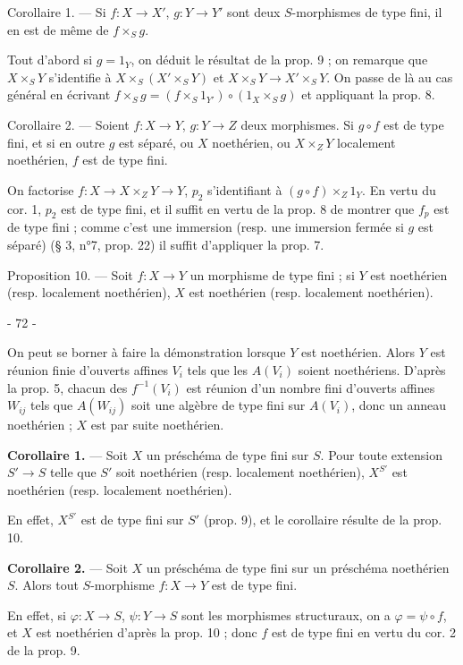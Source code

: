 Corollaire 1. — Si $f : X \to X'$, $g : Y \to Y'$ sont deux $S$-morphismes de type fini, il en est de même de $f \times_S g$.

Tout d'abord si $g = 1_Y$, on déduit le résultat de la prop. 9 ; on remarque que $X \times_S Y$ s'identifie à $X \times_S (X' \times_S Y)$ et $X \times_S Y \to X' \times_S Y$. On passe de là au cas général en écrivant $f \times_S g = (f \times_S 1_{Y'}) \circ (1_X \times_S g)$ et appliquant la prop. 8.

Corollaire 2. — Soient $f : X \to Y$, $g : Y \to Z$ deux morphismes. Si $g \circ f$ est de type fini, et si en outre $g$ est séparé, ou $X$ noethérien, ou $X \times_Z Y$ localement noethérien, $f$ est de type fini.

On factorise $f : X \to X \times_Z Y \to Y$, $p_2$ s'identifiant à $(g \circ f) \times_Z 1_Y$. En vertu du cor. 1, $p_2$ est de type fini, et il suffit en vertu de la prop. 8 de montrer que $f_p$ est de type fini ; comme c'est une immersion (resp. une immersion fermée si $g$ est séparé) (§ 3, n°7, prop. 22) il suffit d'appliquer la prop. 7.

Proposition 10. — Soit $f : X \to Y$ un morphisme de type fini ; si $Y$ est noethérien (resp. localement noethérien), $X$ est noethérien (resp. localement noethérien).

\newpage


- 72 -

On peut se borner à faire la démonstration lorsque $Y$ est noethérien. Alors $Y$ est réunion finie d'ouverts affines $V_i$ tels que les $A(V_i)$ soient noethériens. D'après la prop. 5, chacun des $f^{-1}(V_i)$ est réunion d'un nombre fini d'ouverts affines $W_{ij}$ tels que $A(W_{ij})$ soit une algèbre de type fini sur $A(V_i)$, donc un anneau noethérien ; $X$ est par suite noethérien.

\noindent\textbf{Corollaire 1.} --- Soit $X$ un préschéma de type fini sur $S$. Pour toute extension $S' \to S$ telle que $S'$ soit noethérien (resp. localement noethérien), $X^{S'}$ est noethérien (resp. localement noethérien).

En effet, $X^{S'}$ est de type fini sur $S'$ (prop. 9), et le corollaire résulte de la prop. 10.

\noindent\textbf{Corollaire 2.} --- Soit $X$ un préschéma de type fini sur un préschéma noethérien $S$. Alors tout $S$-morphisme $f : X \to Y$ est de type fini.

En effet, si $\varphi : X \to S$, $\psi : Y \to S$ sont les morphismes structuraux, on a $\varphi = \psi \circ f$, et $X$ est noethérien d'après la prop. 10 ; donc $f$ est de type fini en vertu du cor. 2 de la prop. 9.

